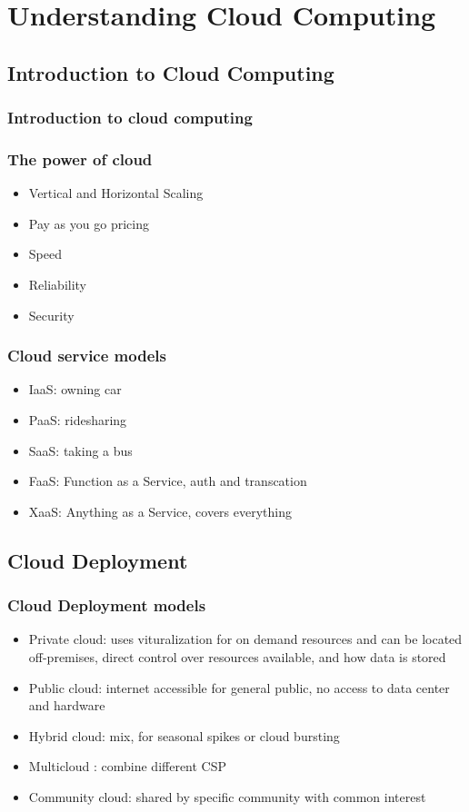 \chapter{Understanding Cloud Computing}
\section{Introduction to Cloud Computing}
\subsection{Introduction to cloud computing}

\subsection{The power of cloud}
\begin{itemize}
    \item Vertical and Horizontal Scaling
    \item Pay as you go pricing
    \item Speed
    \item Reliability
    \item Security
\end{itemize}

\subsection{Cloud service models}
\begin{itemize}
    \item IaaS: owning car
    \item PaaS: ridesharing
    \item SaaS: taking a bus
    \item FaaS: Function as a Service, auth and transcation
    \item XaaS: Anything as a Service, covers everything
\end{itemize}

\section{Cloud Deployment}
\subsection{Cloud Deployment models}
\begin{itemize}
    \item Private cloud: uses vituralization for on demand resources and can be located off-premises, direct control over resources available, and how data is stored
    \item Public cloud: internet accessible for general public, no access to data center and hardware
    \item Hybrid cloud: mix, for seasonal spikes or cloud bursting
    \item Multicloud : combine different CSP
    \item Community cloud: shared by specific community with common interest
\end{itemize}

